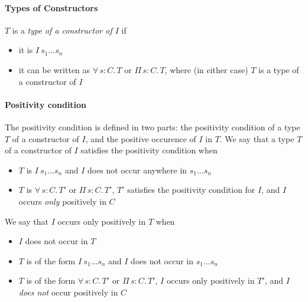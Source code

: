\documentclass{article}
\newcommand{\abs}[4]{{#1}\, #2\! : \! #3.\, #4}
\newcommand{\absu}[3]{{#1}\, #2.\, #3}
\newcommand{\indast}[3]{\texttt{Ind } [#1]\ (#2 := #3)}
\newcommand{\lowerc}[1]{\lfloor {#1} \rfloor}
\newcommand{\lenc}[1]{\|#1\|}
\newcommand{\mumat}[2]{μ'\ #1\ \{#2\} }
\begin{document}
\paragraph{Types of Constructors}

$T$ is a \textit{type of a constructor of $I$} if
\begin{itemize}
\item it is $I\ s_1 ... s_n$
\item it can be written as $\abs{\forall}{s}{C}{T}$ or $\abs{\Pi}{s}{C}{T}$,
  where (in either case) $T$ is a type of a constructor of $I$
\end{itemize}

\paragraph{Positivity condition}
The positivity condition is defined in two parts: the positivity condition of
a type $T$ of a constructor of $I$, and the positive occurence of $I$ in $T$.
We say that a type $T$ of a constructor of $I$ satisfies the positivity condition
when

\begin{itemize}
\item $T$ is $I\ s_1... s_n$ and $I$ does not occur anywhere in $s_1...s_n$
\item $T$ is $\abs{\forall}{s}{C}{T'}$ or $\abs{\Pi}{s}{C}{T'}$, $T'$ satisfies
  the positivity condition for $I$, and $I$ occurs \textit{only} positively in $C$ 
\end{itemize}

\noindent We say that $I$ occurs only positively in $T$ when
\begin{itemize}
\item $I$ does not occur in $T$
\item $T$ is of the form $I\ s_1 ... s_n$ and $I$ does not occur in $s_1 ...
  s_n$
\item $T$ is of the form $\abs{\forall}{s}{C}{T'}$ or $\abs{\Pi}{s}{C}{T'}$, $I$
  occurs only positively in $T'$, and $I$ \textit{does not} occur positively in $C$
\end{itemize}

\end{document}
